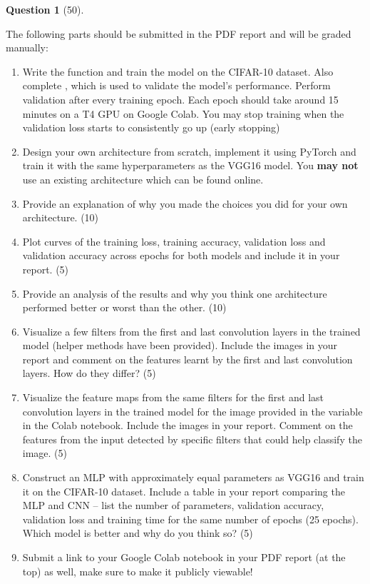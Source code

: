 \documentclass[12pt]{article}
\theoremstyle{definition}
\newtheorem{exercise}{Question}%
\begin{document}
\begin{exercise}[50]
{\begin{enumerate}[label=(\theexercise.\arabic*)]
\end{enumerate}
The following parts should be submitted in the PDF report and will be graded manually:
\begin{enumerate}[start=3]
    \item Write the  function and train the model on the CIFAR-10 dataset. Also complete , which is used to validate the model's performance. Perform validation after every training epoch. Each epoch should take around 15 minutes on a T4 GPU on Google Colab. You may stop training when the validation loss starts to consistently go up (early stopping)
    \item Design your own architecture from scratch, implement it using PyTorch and train it with the same hyperparameters as the VGG16 model. You \textbf{may not} use an existing architecture which can be found online. 
    \item Provide an explanation of why you made the choices you did for your own architecture. (10)
    \item Plot curves of the training loss, training accuracy, validation loss and validation accuracy across epochs for both models and include it in your report.  (5)
    \item Provide an analysis of the results and why you think one architecture performed better or worst than the other. (10)
    \item Visualize a few filters from the first and last convolution layers in the trained model (helper methods have been provided). Include the images in your report and comment on the features learnt by the first and last convolution layers. How do they differ? (5)
    \item Visualize the feature maps from the same filters for the first and last convolution layers in the trained model for the image provided in the variable  in the Colab notebook. Include the images in your report. Comment on the features from the input detected by specific filters that could help classify the image. (5)
    \item Construct an MLP with approximately equal parameters as  VGG16 and train it on the CIFAR-10 dataset. Include a table in your report comparing the MLP and CNN -- list the number of parameters, validation accuracy, validation loss and training time for the same number of epochs (25 epochs). Which model is better and why do you think so? (5)
    \item Submit a link to your Google Colab notebook in your PDF report (at the top) as well, make sure to make it publicly viewable!
\end{enumerate}
}
\vspace{1em}

\end{exercise}
\end{document}
